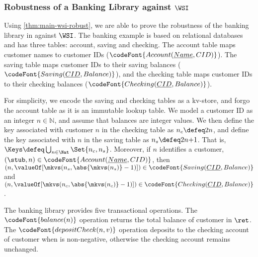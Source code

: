 \subsubsection{Robustness of a Banking Library against $\WSI$}

Using \cref{thm:main-wsi-robust},
we are able to prove the robustness of the banking library in \citet{bank-example-wsi} against \( \WSI \).
The banking example is based on relational databases and has three tables: account, saving and checking.
The account table maps customer names to customer IDs (\( \codeFont{Account(\underline{Name}, CID )} \)).
The saving table maps customer IDs to their saving balances (\( \codeFont{Saving(\underline{CID}, Balance )} \)), and
the checking table maps customer IDs to their checking balances (\( \codeFont{Checking(\underline{CID}, Balance )} \)).

For simplicity, we encode the saving and checking tables as a kv-store,
and forgo the account table as it is an immutable lookup table.
We model a customer ID as an integer \( n \in \mathbb{N}\), and assume that balances are integer values. 
We then define the key associated with customer $n$ in the checking table as 
$n_c \defeq 2 n$,
and define the key associated with $n$ in the saving table as 
$n_s \defeq 2n {+} 1$. 
That is, \( \Keys \defeq \bigcup_{n \in \Nat} \Set{n_c, n_s} \).
Moreover, if \( n \) identifies a customer, \ie $(\stub, n) \in \codeFont{Account(\underline{Name}, CID )}$,
then
\( (n, \valueOf[\mkvs(n_s, \abs{\mkvs(n_s)} - 1)]) \in \codeFont{Saving(\underline{CID}, Balance )} \)
and \( (n, \valueOf[\mkvs(n_c, \abs{\mkvs(n_c)} - 1)]) \in \codeFont{Checking(\underline{CID}, Balance )} \).

The banking library provides five transactional operations.
The \( \codeFont{balance(n)} \) operation returns the total balance of customer  in  \( \ret \).
The \( \codeFont{depositCheck(n,v)} \) operation deposits  to the checking account of customer  when  is non-negative,
otherwise the checking account remains unchanged.


